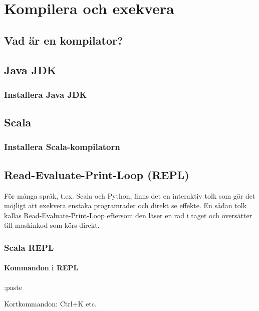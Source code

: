 
\chapter{Kompilera och exekvera}
\section{Vad är en kompilator?}
\section{Java JDK}
\subsection{Installera Java JDK}
\section{Scala}
\subsection{Installera Scala-kompilatorn}
\section{Read-Evaluate-Print-Loop (REPL)}
För många språk, t.ex. Scala och Python, finns det en interaktiv tolk som gör det möjligt att exekvera enstaka programrader och direkt se effekte. En sådan tolk kallas Read-Evaluate-Print-Loop eftersom den läser en rad i taget och översätter till maskinkod som körs direkt.    
\subsection{Scala REPL}
\subsubsection{Kommandon i REPL}
:paste

Kortkommandon: Ctrl+K etc.